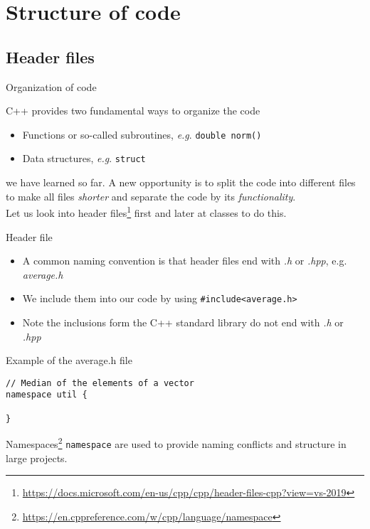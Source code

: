 \documentclass[\classoption]{beamer}
\begin{document}
\section{Structure of code}


\subsection{Header files}

\begin{frame}{Organization of code}
\begin{block}{C++ provides two fundamental ways to organize the code}
\begin{itemize}
\item Functions or so-called subroutines, \emph{e.g}. \lstinline|double norm()|
\item Data structures, \emph{e.g}. \lstinline|struct|
\end{itemize}
\end{block}
we have learned so far. A new opportunity is to split the code into different files to make all files \textit{shorter} and separate the code by its \textit{functionality}. \\
\vspace{0.25cm}
Let us look into header files\footnote{\tiny\url{https://docs.microsoft.com/en-us/cpp/cpp/header-files-cpp?view=vs-2019}} first and later at classes to do this.

\end{frame}

\begin{frame}[fragile]{Header file}
\begin{itemize}
\item A common naming convention is that header files end with \textit{.h} or \textit{.hpp}, e.g. \textit{average.h}
\item We include them into our code by using \lstinline|#include<average.h>|
\item Note the inclusions form the C++ standard library do not end with \textit{.h} or \textit{.hpp}
\end{itemize}

\begin{block}{Example of the average.h file}
\begin{lstlisting}
// Median of the elements of a vector
namespace util {

}
\end{lstlisting}
\end{block}
Namespaces\footnote{\tiny\url{https://en.cppreference.com/w/cpp/language/namespace}} \lstinline|namespace| are used to provide naming conflicts
and structure in large projects.
\end{frame}
\end{document}
